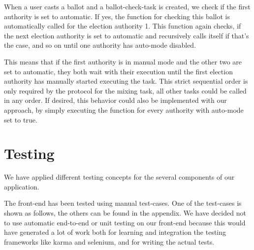 When a user casts a ballot and a ballot-check-task is created, we check if the first authority is set to automatic. If yes, the function for checking this ballot is automatically called for the election authority 1. This function again checks, if the next election authority is set to automatic and recursively calls itself if that's the case, and so on until one authority has auto-mode disabled.

This means that if the first authority is in manual mode and the other two are set to automatic, they both wait with their execution until the first election authority has manually started executing the task. This strict sequential order is only required by the protocol for the mixing task, all other tasks could be called in any order. If desired, this behavior could also be implemented with our approach, by simply executing the function for every authority with auto-mode set to true.

\section{Testing}
We have applied different testing concepts for the several components of our application.

The front-end has been tested using manual test-cases. One of the test-cases is shown as follows, the others can be found in the appendix. We have decided not to use automatic end-to-end or unit testing on our front-end because this would have generated a lot of work both for learning and integration the testing frameworks like karma and selenium, and for writing the actual tests.

